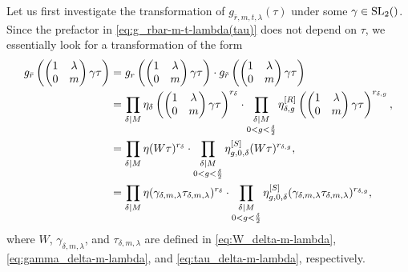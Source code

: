 \documentclass{article}
\begin{document}
Let us first investigate the transformation of
$g_{\bar{r},m,t,\lambda}(\tau)$ under some $\gamma\in\SL2Z$.
%
Since the prefactor in \eqref{eq:g_rbar-m-t-lambda(tau)} does not
depend on $\tau$, we essentially look for a transformation of the form
\begin{align}
  g_{\bar{r}}
  \left(
  \begin{pmatrix}
    1 & \lambda\\
    0 & m
  \end{pmatrix}
  \gamma
  \tau
  \right)
  &=
  g_r
  \left(
  \begin{pmatrix}
    1 & \lambda\\
    0 & m
  \end{pmatrix}
  \gamma
  \tau
  \right)
  \cdot
  g_{\tilde{r}}
  \left(
  \begin{pmatrix}
    1 & \lambda\\
    0 & m
  \end{pmatrix}
  \gamma
  \tau
  \right)
  \notag\\
  &=
  \prod_{\delta \mid M}
  \eta_\delta
  \left(
  \begin{pmatrix}
    1 & \lambda\\
    0 & m
  \end{pmatrix}
  \gamma
  \tau
  \right)^{r_\delta}
  \cdot
      \prod_{\substack{\delta \mid M\\0<g<\frac{\delta}{2}}}
  \eta_{\delta,g}^{[R]}
  \left(
  \begin{pmatrix}
    1 & \lambda\\
    0 & m
  \end{pmatrix}
  \gamma
  \tau
  \right)^{r_{\delta,g}},
  \notag\\
  &=
  \prod_{\delta \mid M}
  \eta(W\tau)^{r_\delta}
  \cdot
  \prod_{\substack{\delta \mid M\\0 < g < \frac{\delta}{2}}}
  \eta_{g,0,\delta}^{[S]}(W\tau)^{r_{\delta,g}},
  \notag\\
  &=
  \prod_{\delta \mid M}
  \eta(\gamma_{\delta,m,\lambda}\tau_{\delta,m,\lambda})^{r_\delta}
  \cdot
  \prod_{\substack{\delta \mid M\\0 < g < \frac{\delta}{2}}}
  \eta_{g,0,\delta}^{[S]}(\gamma_{\delta,m,\lambda}\tau_{\delta,m,\lambda})^{r_{\delta,g}},
\end{align}
where $W$, $\gamma_{\delta,m,\lambda}$, and $\tau_{\delta,m,\lambda}$
are defined in \eqref{eq:W_delta-m-lambda},
\eqref{eq:gamma_delta-m-lambda}, and
\eqref{eq:tau_delta-m-lambda}, respectively.
\end{document}
